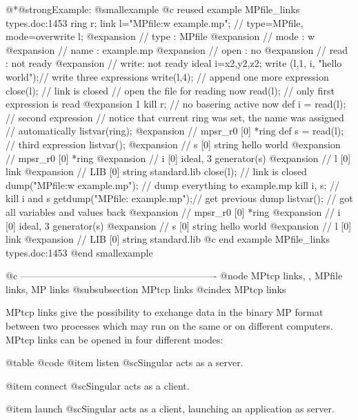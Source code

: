 {{{{{{@*@strong{Example:}
@smallexample
@c reused example MPfile_links types.doc:1453 
  ring r;
  link l="MPfile:w example.mp"; // type=MPfile, mode=overwrite
  l;
@expansion{} // type : MPfile
@expansion{} // mode : w
@expansion{} // name : example.mp
@expansion{} // open : no
@expansion{} // read : not ready
@expansion{} // write: not ready
  ideal i=x2,y2,z2;
  write (l,1, i, "hello world");// write three expressions
  write(l,4);                   // append one more expression
  close(l);                     // link is closed
  // open the file for reading now
  read(l);                      // only first expression is read
@expansion{} 1
  kill r;                       // no basering active now
  def i = read(l);              // second expression
  // notice that current ring was set, the name was assigned
  // automatically
  listvar(ring);
@expansion{} // mpsr_r0              [0]  *ring
  def s = read(l);              // third expression
  listvar();
@expansion{} // s                    [0]  string hello world
@expansion{} // mpsr_r0              [0]  *ring
@expansion{} //      i                    [0]  ideal, 3 generator(s)
@expansion{} // l                    [0]  link
@expansion{} // LIB                  [0]  string standard.lib
  close(l);                     // link is closed
  dump("MPfile:w example.mp");  // dump everything to example.mp
  kill i, s;                    // kill i and s
  getdump("MPfile: example.mp");// get previous dump
  listvar();                    // got all variables and values back
@expansion{} // mpsr_r0              [0]  *ring
@expansion{} //      i                    [0]  ideal, 3 generator(s)
@expansion{} // s                    [0]  string hello world
@expansion{} // l                    [0]  link
@expansion{} // LIB                  [0]  string standard.lib
@c end example MPfile_links types.doc:1453
@end smallexample

@c -------------------------------------------------------------
@node MPtcp links,  , MPfile links, MP links
@subsubsection MPtcp links
@cindex MPtcp links

MPtcp links give the possibility to exchange data in the binary MP
format between two processes which may run on the same or on different
computers. MPtcp links can be opened in four different modes:

@table @code
@item listen
@sc{Singular} acts as a server.

@item connect
@sc{Singular} acts as a client.

@item launch
@sc{Singular} acts as a client, launching an application as server.

}}}}}}
